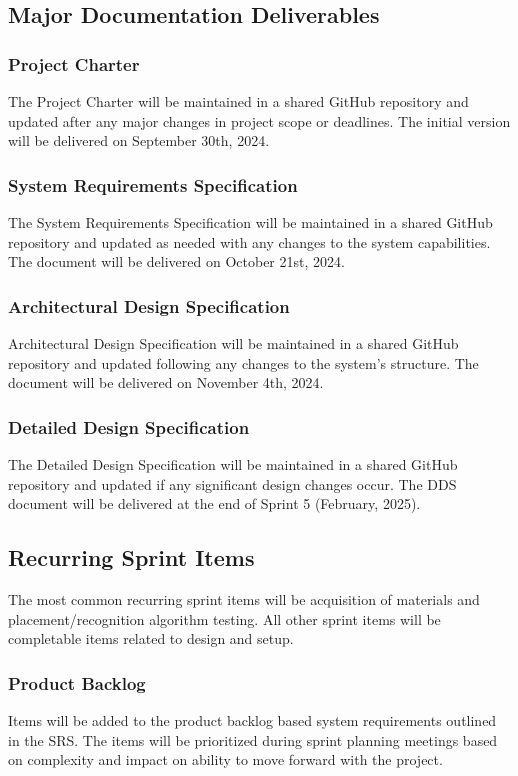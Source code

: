 
\subsection{Major Documentation Deliverables}

\subsubsection{Project Charter}
The Project Charter will be maintained in a shared GitHub repository and updated after any major changes in project scope or deadlines. The initial version will be delivered on September 30th, 2024.

\subsubsection{System Requirements Specification}
The System Requirements Specification will be maintained in a shared GitHub repository and updated as needed with any changes to the system capabilities. The document will be delivered on October 21st, 2024.

\subsubsection{Architectural Design Specification}
Architectural Design Specification will be maintained in a shared GitHub repository and updated following any changes to the system's structure. The document will be delivered on November 4th, 2024. 


\subsubsection{Detailed Design Specification}
The Detailed Design Specification will be maintained in a shared GitHub repository and updated if any significant design changes occur. The DDS document will be delivered at the end of Sprint 5 (February, 2025).

\subsection{Recurring Sprint Items}
The most common recurring sprint items will be acquisition of materials and placement/recognition algorithm testing. All other sprint items will be completable items related to design and setup.

\subsubsection{Product Backlog}
Items will be added to the product backlog based system requirements outlined in the SRS. The items will be prioritized during sprint planning meetings based on complexity and impact on ability to move forward with the project.

